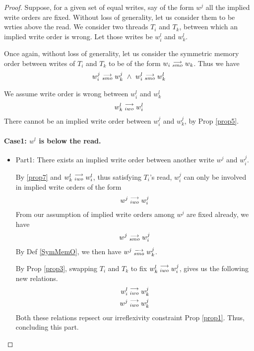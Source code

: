         \begin{proof}
            Suppose, for a given set of equal writes, say of the form $w^j$ all the implied write orders are fixed. Without loss of generality, let us consider them to be wrties above the read. We consider two threads $T_i$ and $T_k$, between which an implied write order is wrong. Let those writes be $w_i^l$ and $w_k^l$. 

            Once again, without loss of generality, let us consider the symmetric memory order between writes of $T_i$ and $T_k$ to be of the form $w_i\stackrel{\longrightarrow}{_{smo}}w_k$. Thus we have 
            \begin{align*}
                \reln{w_i^j}{smo}{w_k^j} \ \wedge \ \reln{w_i^l}{smo}{w_k^l}
            \end{align*}

            We assume write order is wrong between $w_i^l$ and $w_k^l$
            \begin{align*}
                w_k^l\stackrel{\longrightarrow}{_{iwo}}w_i^l
            \end{align*} 
            There cannot be an implied write order between $w_i^j$ and $w_k^j$, by Prop \ref{prop5}. 

            \paragraph{Case1: $w^l$ is below the read.}
                
                \begin{itemize}
                    \item Part1: There exists an implied write order between another write $w^j$ and $w_i^j$. 

                    By \ref{prop7} and $w_k^l\stackrel{\longrightarrow}{_{iwo}}w_i^l$, thus satisfying $T_i$'s read, $w_i^j$ can only be involved in implied write orders of the form 
                    \begin{align*}
                        w^j\stackrel{\longrightarrow}{_{iwo}}w_i^j
                    \end{align*}
                    From our assumption of implied write orders among $w^j$ are fixed already, we have
                    \begin{align*}
                        w^j\stackrel{\longrightarrow}{_{smo}}w_i^j 
                    \end{align*} 
                    By Def \ref{SymMemO}, we then have $w^j\stackrel{\longrightarrow}{_{smo}}w_k^j$.

                    By Prop \ref{prop3}, swapping $T_i$ and $T_k$ to fix $w_k^l\stackrel{\longrightarrow}{_{iwo}}w_i^j$, gives us the following new relations.
                    \begin{align*}
                        w_i^l\stackrel{\longrightarrow}{_{iwo}}w_k^j \\
                        w^j\stackrel{\longrightarrow}{_{iwo}}w_k^j
                    \end{align*}
                    Both these relations repsect our irreflexivity constraint Prop \ref{prop1}. Thus, concluding this part. 
                    

\end{itemize}
\end{proof}

